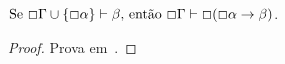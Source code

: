     \begin{theorem}
        $\text{Se }\Box\Gamma\cup\{\Box\alpha\}\vdash\beta\text{, então }\Box\Gamma\vdash\Box(\Box\alpha\to\beta)$.

        \begin{proof}
            Prova em~\cite{Marcus}.
        \end{proof}
    \end{theorem}




                


